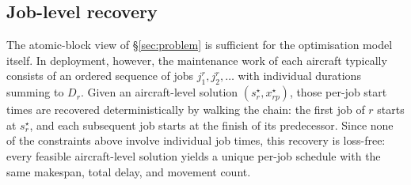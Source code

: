 \subsection{Job-level recovery}
\label{sec:job_recovery}

The atomic-block view of \S\ref{sec:problem} is sufficient for the
optimisation model itself.  In deployment, however, the maintenance work
of each aircraft typically consists of an ordered sequence of jobs
$j^r_1, j^r_2, \ldots$ with individual durations summing to $D_r$.  Given
an aircraft-level solution $(s_r^\star, x_{rp}^\star)$, those per-job
start times are recovered deterministically by walking the chain: the
first job of $r$ starts at $s_r^\star$, and each subsequent job starts at
the finish of its predecessor.  Since none of the constraints above
involve individual job times, this recovery is loss-free: every feasible
aircraft-level solution yields a unique per-job schedule with the same
makespan, total delay, and movement count.

